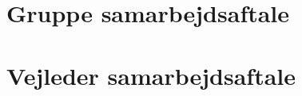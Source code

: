 \appendix

\chapter{Gruppe samarbejdsaftale}
\label{bil:gruppe_samarbejdsaftale}


\chapter{Vejleder samarbejdsaftale}
\label{bil:vejleder_samarbejdsaftale}

